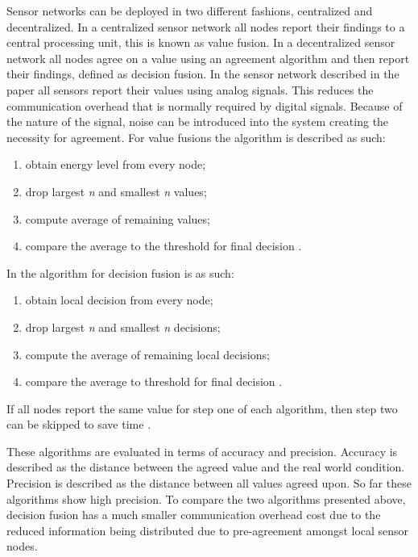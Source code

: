 \documentclass[twoside, conference]{IEEEtran}%
\begin{document}
Sensor networks can be deployed in two different fashions, centralized and decentralized. In a centralized sensor network all nodes report their findings to a central processing unit, this is known as value fusion. In a decentralized sensor network all nodes agree on a value using an agreement algorithm and then report their findings, defined as decision fusion. In the sensor network described in the paper all sensors report their values using analog signals. This reduces the communication overhead that is normally required by digital signals. Because of the nature of the signal, noise can be introduced into the system creating the necessity for agreement. For value fusions the algorithm is described as such:
\begin{enumerate}
	\item obtain energy level from every node;
	\item drop largest \textit{n} and smallest \textit{n} values;
	\item compute average of remaining values;
	\item compare the average to the threshold for final decision \cite{Clouqueur2004}.
\end{enumerate}
In \cite{Clouqueur2004} the algorithm for decision fusion is as such:
\begin{enumerate}
	\item obtain local decision from every node;
	\item drop largest \textit{n} and smallest \textit{n} decisions;
	\item compute the average of remaining local decisions;
	\item compare the average to threshold for final decision \cite{Clouqueur2004}.
\end{enumerate}
If all nodes report the same value for step one of each algorithm, then step two can be skipped to save time \cite{Clouqueur2004}.

These algorithms are evaluated in terms of accuracy and precision. Accuracy is described as the distance between the agreed value and the real world condition. Precision is described as the distance between all values agreed upon. So far these algorithms show high precision. To compare the two algorithms presented above, decision fusion has a much smaller communication overhead cost due to the reduced information being distributed due to pre-agreement amongst local sensor nodes.

\end{document}
